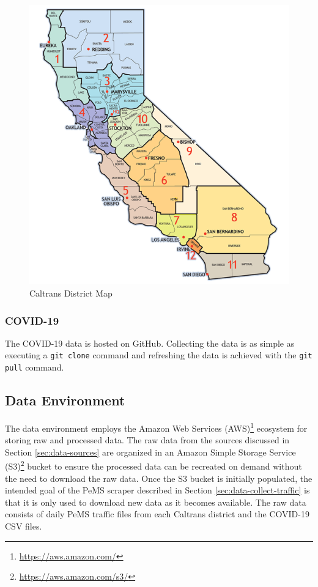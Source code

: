 \documentclass{article}
\begin{document}
\begin{figure}[hbt!]
	\centering
	\includegraphics[scale=0.5]{images/caltrans-district-map.png}
	\caption{Caltrans District Map\protect\footnotemark}
	\label{fig:caltrans-map}
\end{figure}


\subsubsection{COVID-19}

The COVID-19 data is hosted on GitHub. Collecting the data is as simple as executing a \texttt{git clone} command and refreshing the data is achieved with the \texttt{git pull} command.

\subsection{Data Environment}
\label{sec:data-env}

The data environment employs the Amazon Web Services (AWS)\footnote{\url{https://aws.amazon.com/}} ecosystem for storing raw and processed data. The raw data from the sources discussed in Section \ref{sec:data-sources} are organized in an Amazon Simple Storage Service (S3)\footnote{\url{https://aws.amazon.com/s3/}} bucket to ensure the processed data can be recreated on demand without the need to download the raw data. Once the S3 bucket is initially populated, the intended goal of the PeMS scraper described in Section \ref{sec:data-collect-traffic} is that it is only used to download new data as it becomes available. The raw data consists of daily PeMS traffic files from each Caltrans district and the COVID-19 CSV files.
\end{document}
